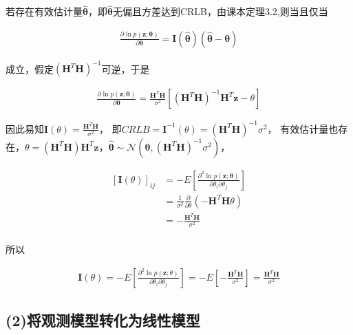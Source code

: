 \documentclass[fontset=windows]{article}
\numberwithin{figure}{section}
\begin{document}
若存在有效估计量\(\hat{\boldsymbol{\theta}}\)，即\(\hat{\boldsymbol{\theta}}\)无偏且方差达到CRLB，由课本定理3.2,则当且仅当

\begin{align*}
	\frac{\partial \ln p(\mathbf{z};\boldsymbol{\theta})}{\partial \boldsymbol{\theta}}=
	\mathbf{I}(\hat{\boldsymbol{\theta}})(\hat{\boldsymbol{\theta}}-\boldsymbol{\theta})
\end{align*}

成立，假定\((\mathbf{H}^T\mathbf{H})^{-1}\)可逆，于是

\begin{align*}
	\frac{\partial \ln p(\mathbf{z};\boldsymbol{\theta})}{\partial \mathbf{\boldsymbol{\theta}}}=
	\frac{\mathbf{H}^T\mathbf{H}}{\sigma^2}\left[\left(\mathbf{H}^T\mathbf{H}\right)^{-1}
		\mathbf{H}^T\mathbf{z}-\theta\right]
\end{align*}

因此易知\(\mathbf{I}(\theta)=\frac{\mathbf{H}^T\mathbf{H}}{\sigma^2}\)，
即\(CRLB=\mathbf{I}^{-1}(\theta)=\left(\mathbf{H}^T\mathbf{H}\right)^{-1}\sigma^2\)，
有效估计量也存在，\(\theta=\left(\mathbf{H}^T\mathbf{H}\right)\mathbf{H}^T\mathbf{z}，
\hat{\boldsymbol{\theta}} \sim \mathcal{N} (\boldsymbol{\theta},
\left(\mathbf{H}^T\mathbf{H}\right)^{-1}\sigma^2)\)，

\begin{align*}
	\left[\mathbf{I}(\theta)\right]_{ij}
	 & =-E\left[\frac{\partial^2 \ln p(\mathbf{z};\boldsymbol{\theta})}{\partial \theta_i \partial \theta_j}\right] \\
	 & =\frac{1}{\sigma^2}\frac{\partial}{\partial \theta}\left(-\mathbf{H}^T\mathbf{H}\theta\right)                \\
	 & =-\frac{\mathbf{H}^T\mathbf{H}}{\sigma^2}                                                                    \\
\end{align*}

所以

\begin{align*}
	\mathbf{I}(\theta)=
	-E\left[\frac{\partial^2 \ln p(\mathbf{z};\theta)}{\partial \theta_i \partial \theta_j}\right]
	=-E\left[-\frac{\mathbf{H}^T\mathbf{H}}{\sigma^2}\right]
	=\frac{\mathbf{H}^T\mathbf{H}}{\sigma^2}
\end{align*}

\subsection*{(2)将观测模型转化为线性模型}
\end{document}
